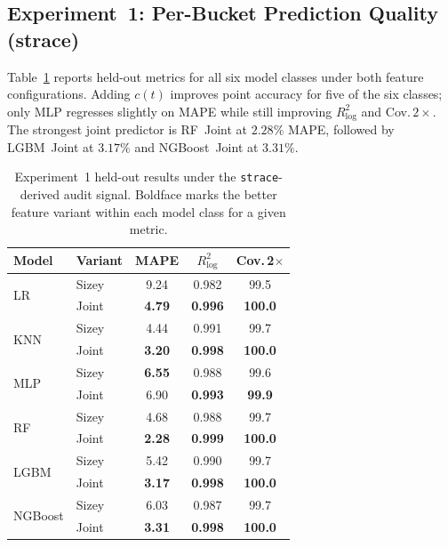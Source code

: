 \subsection{Experiment~1: Per-Bucket Prediction Quality (strace)}
\label{sec:exp1}

Table~\ref{tab:exp1-final} reports held-out metrics for all
six model classes under both feature configurations. Adding
$c(t)$ improves point accuracy for five of the six classes;
only MLP regresses slightly on MAPE while still improving
$R^2_{\log}$ and Cov.\,$2\times$. The strongest joint
predictor is RF~Joint at $2.28\%$ MAPE, followed by LGBM~Joint
at $3.17\%$ and NGBoost~Joint at $3.31\%$.

\begin{table}[t]
\centering
\caption{Experiment~1 held-out results under the
\texttt{strace}-derived audit signal. Boldface marks the
better feature variant within each model class for a given
metric.}
\label{tab:exp1-final}
\footnotesize
\setlength{\tabcolsep}{3pt}
\renewcommand{\arraystretch}{1.12}
\begin{tabular}{|l|l|c|c|c|}
\hline
\textbf{Model} & \textbf{Variant} & \textbf{MAPE} & \textbf{$R^2_{\log}$} & \textbf{Cov.\,2$\times$} \\
\hline
\multirow{2}{*}{LR}
  & Sizey  & 9.24            & 0.982            & 99.5 \\
\cline{2-5}
  & Joint  & \textbf{4.79}   & \textbf{0.996}   & \textbf{100.0} \\
\hline
\multirow{2}{*}{KNN}
  & Sizey  & 4.44            & 0.991            & 99.7 \\
\cline{2-5}
  & Joint  & \textbf{3.20}   & \textbf{0.998}   & \textbf{100.0} \\
\hline
\multirow{2}{*}{MLP}
  & Sizey  & \textbf{6.55}   & 0.988            & 99.6 \\
\cline{2-5}
  & Joint  & 6.90            & \textbf{0.993}   & \textbf{99.9} \\
\hline
\multirow{2}{*}{RF}
  & Sizey  & 4.68            & 0.988            & 99.7 \\
\cline{2-5}
  & Joint  & \textbf{2.28}   & \textbf{0.999}   & \textbf{100.0} \\
\hline
\multirow{2}{*}{LGBM}
  & Sizey  & 5.42            & 0.990            & 99.7 \\
\cline{2-5}
  & Joint  & \textbf{3.17}   & \textbf{0.998}   & \textbf{100.0} \\
\hline
\multirow{2}{*}{NGBoost}
  & Sizey  & 6.03            & 0.987            & 99.7 \\
\cline{2-5}
  & Joint  & \textbf{3.31}   & \textbf{0.998}   & \textbf{100.0} \\
\hline
\end{tabular}
\end{table}

